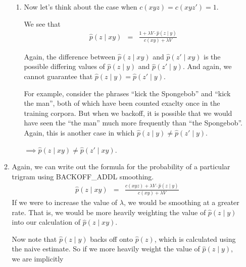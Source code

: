 \documentclass[11pt]{article}
\begin{document}
\begin{enumerate}
\begin{enumerate}[label=(\alph*)]
\begin{enumerate}[label=\roman*.]
		\item
			Now let's think about the case when $c(xyz) = c(xyz') = 1$. \vspace{4pt}

			We see that
			\begin{eqnarray*}
				\hat{p}(z\mid xy) &=& \frac{1 + \lambda V \cdot \hat{p}(z \mid y)}{c(xy) + \lambda V}
			\end{eqnarray*}

			Again, the difference between $\hat{p}(z\mid xy)$ and $\hat{p}(z' \mid xy)$ is the possible differing values of $\hat{p}(z \mid y)$ and $\hat{p}(z' \mid y)$. And again, we cannot guarantee that $\hat{p}(z \mid y) = \hat{p}(z' \mid y)$. \vspace{4pt}

			For example, consider the phrases ``kick the Spongebob'' and ``kick the man'', both of which have been counted exaclty once in the training corpora. But when we backoff, it is possible that we would have seen the ``the man'' much more frequently than ``the Spongebob''. Again, this is another case in which $\hat{p}(z \mid y) \neq \hat{p}(z' \mid y)$. \vspace{4pt}

			$\implies \hat{p}(z\mid xy) \neq \hat{p}(z' \mid xy)$. \vspace{4pt}

		\end{enumerate}

	\item %
		Again, we can write out the formula for the probability of a particular trigram using BACKOFF\_ADDL smoothing.
		\begin{eqnarray*}
			\hat{p}(z\mid xy) &=& \frac{c(xyz) + \lambda V \cdot \hat{p}(z \mid y)}{c(xy) + \lambda V}
		\end{eqnarray*}
		If we were to increase the value of $\lambda$, we would be smoothing at a greater rate. That is, we would be more heavily weighting the value of $\hat{p}(z \mid y)$ into our calculation of $\hat{p}(z \mid xy)$. 

		Now note that $\hat{p}(z \mid y)$ backs off onto $\hat{p}(z)$, which is calculated using the naive estimate. So if we more heavily weight the value of $\hat{p}(z \mid y)$, we are implicitly 


\end{enumerate}
\end{enumerate}
\end{document}
